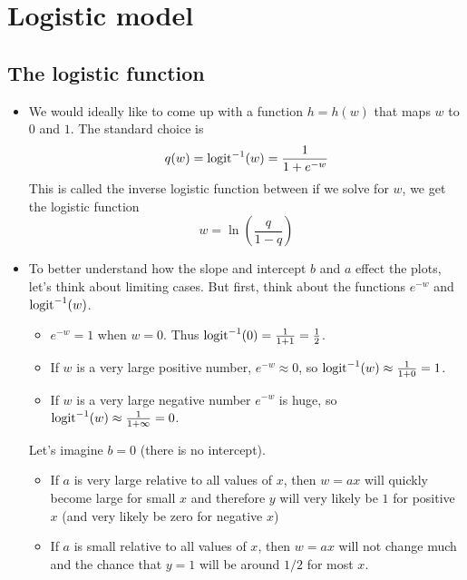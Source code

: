 \section{Logistic model}

\subsection{The logistic function}
\begin{itemize}
\item We would ideally like to come up with a function $h = h(w)$ that maps $w$ to $0$ and $1$. The standard choice is \begin{equation}
q(w) = {\rm logit}^{-1}(w) = \frac{1}{1+e^{-w}}
\end{equation}
This is called the inverse logistic function between if we solve for $w$, we get the {\dfn logistic function}
\begin{equation}
w= \ln \left(\frac{q}{1-q} \right)
\end{equation}





\item To better understand how the slope and intercept $b$ and $a$ effect the plots, let's think about limiting cases. 
But first, think about the functions $e^{-w}$ and ${\rm logit}^{-1}(w)$. 

\begin{itemize}
\item $e^{-w} = 1$ when $w=0$. Thus $
{\rm logit}^{-1}(0) = \frac{1}{1 + 1} = \frac{1}{2}$.
\item  If $w$ is a very large positive number, $e^{-w} \approx 0$, so 
${\rm logit}^{-1}(w) \approx \frac{1}{1+0} = 1$.
\item  If $w$ is a very large negative number $e^{-w}$ is huge, so 
${\rm logit}^{-1}(w) \approx \frac{1}{1+\infty} = 0$.
\end{itemize}





Let's imagine $b=0$ (there is no intercept). 

\begin{itemize}
\item  If $a$ is very large relative to all values of $x$, then $w = ax$ will quickly become large for small $x$ and therefore $y$ will very likely be $1$ for positive $x$ (and very likely be zero for negative $x$)
\item  If $a$ is small relative to all values of $x$, then $w =ax$ will not change much and the chance that $y=1$ will be around $1/2$ for most $x$.
\end{itemize} 



\end{itemize}
